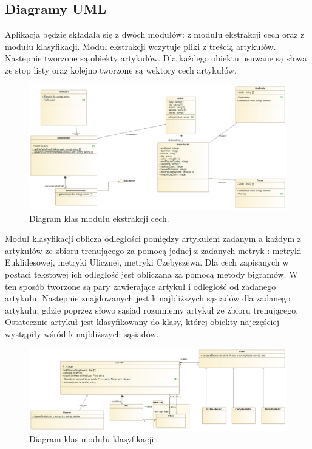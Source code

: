 \documentclass{classrep}
\begin{document}
\subsection{Diagramy UML}

Aplikacja będzie składała się z dwóch modułów: z modułu ekstrakcji cech oraz z modułu klasyfikacji. Moduł ekstrakcji wczytuje pliki z treścią artykułów. Następnie tworzone są obiekty artykułów. Dla każdego obiektu usuwane są słowa ze stop listy oraz kolejno tworzone są wektory cech artykułów. 

\begin{figure}[h!]
 \centering
 \includegraphics[width=14cm]{Ekstrakcja.png}
 \vspace{-0.3cm}
 \caption{Diagram klas modułu ekstrakcji cech. }
 \label{rysunek do eksperymentu 1 wariantu 1}
\end{figure}
\newpage

Moduł klasyfikacji oblicza odległości pomiędzy artykułem zadanym a każdym z artykułów ze zbioru trenującego za pomocą jednej z zadanych metryk \cite{dane} : metryki Euklidesowej, metryki Ulicznej, metryki Czebyszewa. Dla cech zapisanych w postaci tekstowej ich odległość jest obliczana za pomocą metody bigramów. W ten sposób tworzone są pary zawierające artykuł i odleglość od zadanego artykułu. Następnie znajdowanych jest k najbliższych sąsiadów dla zadanego artykułu, gdzie poprzez słowo sąsiad rozumiemy artykuł ze zbioru trenującego. Ostatecznie artykuł jest klasyfikowany do klasy, której obiekty najczęściej wystąpiły wśród k najbliższych sąsiadów. 

\begin{figure}[h!]
 \centering
 \includegraphics[width=14cm]{Klasyfikator.png}
 \vspace{-0.3cm}
 \caption{Diagram klas modułu klasyfikacji. }
 \label{rysunek do eksperymentu 1 wariantu 1}
\end{figure}
\end{document}
